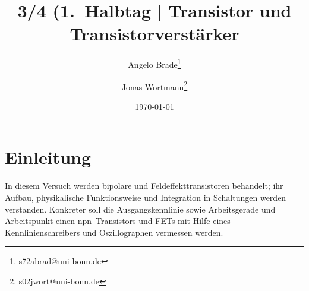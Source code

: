 \documentclass[a4paper,10pt]{article}
\numberwithin{equation}{section}
\begin{document}

\begin{titlepage}
        \title{3/4 (1.\ Halbtag $|$ Transistor und Transistorverstärker}
        \author[1]{Angelo Brade\thanks{s72abrad@uni-bonn.de}}
        \author[1]{Jonas Wortmann\thanks{s02jwort@uni-bonn.de}}
        \date{\today}
\end{titlepage}

\maketitle
{}


\newpage


\fancyhead[R]{\thepage}
\fancyfoot[C]{}

\tableofcontents


\newpage


\fancyhead[R]{\leftmark}

\section{Einleitung}
In diesem Versuch werden bipolare und Feldeffekttransistoren behandelt; ihr Aufbau, physikalische Funktionsweise und Integration in Schaltungen werden verstanden.
Konkreter soll die Ausgangskennlinie sowie Arbeitsgerade und Arbeitspunkt einen npn--Transistors und FETs mit Hilfe eines Kennlinienschreibers und Oszillographen vermessen werden.

\clearpage
\end{document}
